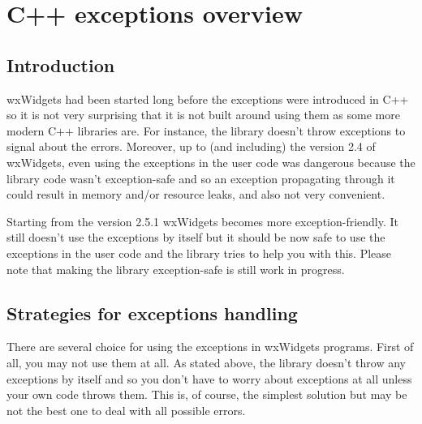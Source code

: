 
\section{C++ exceptions overview}\label{exceptionsoverview}

\subsection{Introduction}\label{exceptionintroduction}

wxWidgets had been started long before the exceptions were introduced in C++ so
it is not very surprising that it is not built around using them as some more
modern C++ libraries are. For instance, the library doesn't throw exceptions to
signal about the errors. Moreover, up to (and including) the version 2.4 of
wxWidgets, even using the exceptions in the user code was dangerous because the
library code wasn't exception-safe and so an exception propagating through it
could result in memory and/or resource leaks, and also not very convenient.

Starting from the version 2.5.1 wxWidgets becomes more exception-friendly. It
still doesn't use the exceptions by itself but it should be now safe to use the
exceptions in the user code and the library tries to help you with this. Please
note that making the library exception-safe is still work in progress.


\subsection{Strategies for exceptions handling}\label{exceptionstrategies}

There are several choice for using the exceptions in wxWidgets programs. First
of all, you may not use them at all. As stated above, the library doesn't throw
any exceptions by itself and so you don't have to worry about exceptions at all
unless your own code throws them. This is, of course, the simplest solution but
may be not the best one to deal with all possible errors.

